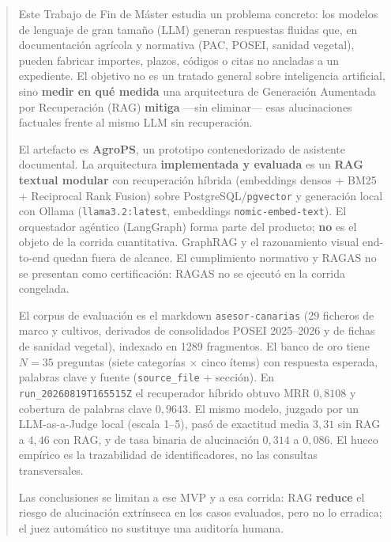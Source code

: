 \begin{abstract}
Este Trabajo de Fin de Máster estudia un problema concreto: los modelos de lenguaje de gran tamaño (LLM) generan respuestas fluidas que, en documentación agrícola y normativa (PAC, POSEI, sanidad vegetal), pueden fabricar importes, plazos, códigos o citas no ancladas a un expediente. El objetivo no es un tratado general sobre inteligencia artificial, sino \textbf{medir en qué medida} una arquitectura de Generación Aumentada por Recuperación (RAG) \textbf{mitiga} ---sin eliminar--- esas alucinaciones factuales frente al mismo LLM sin recuperación.

El artefacto es \textbf{AgroPS}, un prototipo contenedorizado de asistente documental. La arquitectura \textbf{implementada y evaluada} es un \textbf{RAG textual modular} con recuperación híbrida (embeddings densos + BM25 + Reciprocal Rank Fusion) sobre PostgreSQL/\texttt{pgvector} y generación local con Ollama (\texttt{llama3.2:latest}, embeddings \texttt{nomic-embed-text}). El orquestador agéntico (LangGraph) forma parte del producto; \textbf{no} es el objeto de la corrida cuantitativa. GraphRAG y el razonamiento visual end-to-end quedan fuera de alcance. El cumplimiento normativo y RAGAS no se presentan como certificación: RAGAS no se ejecutó en la corrida congelada.

El corpus de evaluación es el markdown \texttt{asesor-canarias} (29 ficheros de marco y cultivos, derivados de consolidados POSEI 2025--2026 y de fichas de sanidad vegetal), indexado en 1289 fragmentos. El banco de oro tiene $N=35$ preguntas (siete categorías $\times$ cinco ítems) con respuesta esperada, palabras clave y fuente (\texttt{source\_file} + sección). En \texttt{run\_20260819T165515Z} el recuperador híbrido obtuvo MRR $0{,}8108$ y cobertura de palabras clave $0{,}9643$. El mismo modelo, juzgado por un LLM-as-a-Judge local (escala 1--5), pasó de exactitud media $3{,}31$ sin RAG a $4{,}46$ con RAG, y de tasa binaria de alucinación $0{,}314$ a $0{,}086$. El hueco empírico es la trazabilidad de identificadores, no las consultas transversales.

Las conclusiones se limitan a ese MVP y a esa corrida: RAG \textbf{reduce} el riesgo de alucinación extrínseca en los casos evaluados, pero no lo erradica; el juez automático no sustituye una auditoría humana.
\end{abstract}

